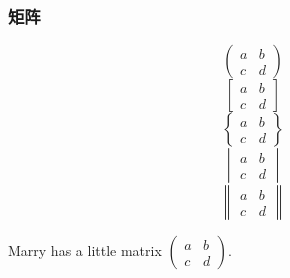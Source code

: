 \documentclass[UTF8]{ctexart}
\begin{document}
\subsubsection{矩阵}
\[\begin{pmatrix} a&b\\c&d \end{pmatrix} \quad\]
\[\begin{bmatrix} a&b\\c&d \end{bmatrix} \quad\]
\[\begin{Bmatrix} a&b\\c&d \end{Bmatrix} \quad\]
\[\begin{vmatrix} a&b\\c&d \end{vmatrix} \quad\]
\[\begin{Vmatrix} a&b\\c&d \end{Vmatrix} \quad\]

Marry has a little matrix $(\begin{smallmatrix} a&b\\c&d \end{smallmatrix})$.
\end{document}
